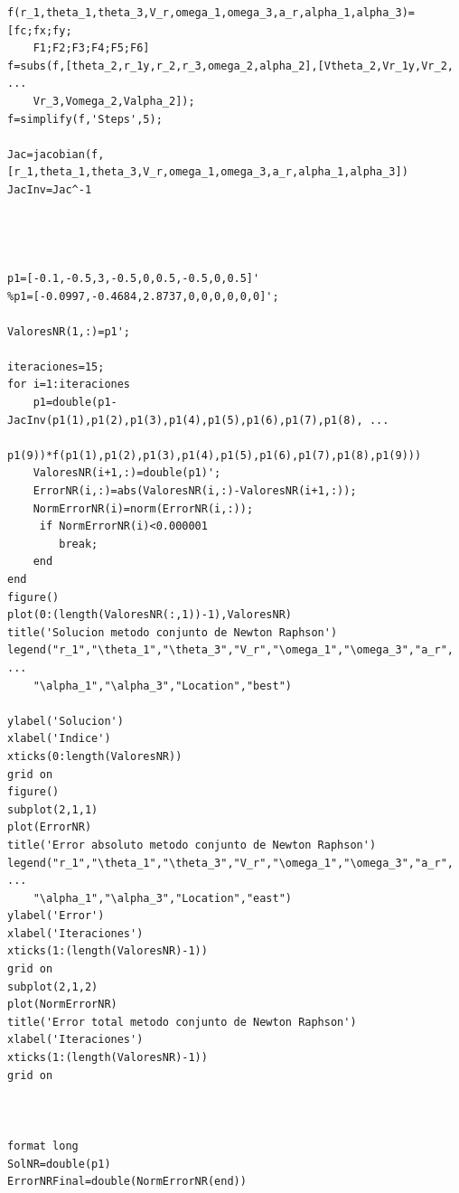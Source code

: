\documentclass[12pt]{article}
\begin{document}
\begin{lstlisting}
f(r_1,theta_1,theta_3,V_r,omega_1,omega_3,a_r,alpha_1,alpha_3)=[fc;fx;fy;
    F1;F2;F3;F4;F5;F6]
f=subs(f,[theta_2,r_1y,r_2,r_3,omega_2,alpha_2],[Vtheta_2,Vr_1y,Vr_2, ...
    Vr_3,Vomega_2,Valpha_2]);
f=simplify(f,'Steps',5);

Jac=jacobian(f, [r_1,theta_1,theta_3,V_r,omega_1,omega_3,a_r,alpha_1,alpha_3])
JacInv=Jac^-1




p1=[-0.1,-0.5,3,-0.5,0,0.5,-0.5,0,0.5]'
%p1=[-0.0997,-0.4684,2.8737,0,0,0,0,0,0]';

ValoresNR(1,:)=p1';

iteraciones=15;
for i=1:iteraciones
    p1=double(p1-JacInv(p1(1),p1(2),p1(3),p1(4),p1(5),p1(6),p1(7),p1(8), ...
        p1(9))*f(p1(1),p1(2),p1(3),p1(4),p1(5),p1(6),p1(7),p1(8),p1(9)))
    ValoresNR(i+1,:)=double(p1)';
    ErrorNR(i,:)=abs(ValoresNR(i,:)-ValoresNR(i+1,:));
    NormErrorNR(i)=norm(ErrorNR(i,:));
     if NormErrorNR(i)<0.000001
        break;
    end
end
figure()
plot(0:(length(ValoresNR(:,1))-1),ValoresNR)
title('Solucion metodo conjunto de Newton Raphson')
legend("r_1","\theta_1","\theta_3","V_r","\omega_1","\omega_3","a_r", ...
    "\alpha_1","\alpha_3","Location","best")

ylabel('Solucion')
xlabel('Indice')
xticks(0:length(ValoresNR))
grid on
figure()
subplot(2,1,1)
plot(ErrorNR)
title('Error absoluto metodo conjunto de Newton Raphson')
legend("r_1","\theta_1","\theta_3","V_r","\omega_1","\omega_3","a_r", ...
    "\alpha_1","\alpha_3","Location","east")
ylabel('Error')
xlabel('Iteraciones')
xticks(1:(length(ValoresNR)-1))
grid on
subplot(2,1,2)
plot(NormErrorNR)
title('Error total metodo conjunto de Newton Raphson')
xlabel('Iteraciones')
xticks(1:(length(ValoresNR)-1))
grid on



format long
SolNR=double(p1)
ErrorNRFinal=double(NormErrorNR(end))
\end{lstlisting}
\newpage
\end{document}
